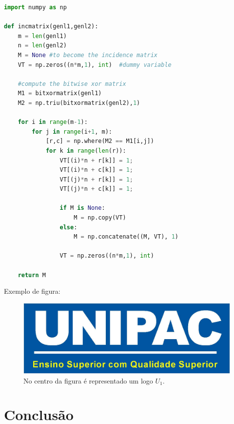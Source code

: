 \begin{lstlisting}[language=Python]
import numpy as np
 
def incmatrix(genl1,genl2):
    m = len(genl1)
    n = len(genl2)
    M = None #to become the incidence matrix
    VT = np.zeros((n*m,1), int)  #dummy variable
 
    #compute the bitwise xor matrix
    M1 = bitxormatrix(genl1)
    M2 = np.triu(bitxormatrix(genl2),1) 
 
    for i in range(m-1):
        for j in range(i+1, m):
            [r,c] = np.where(M2 == M1[i,j])
            for k in range(len(r)):
                VT[(i)*n + r[k]] = 1;
                VT[(i)*n + c[k]] = 1;
                VT[(j)*n + r[k]] = 1;
                VT[(j)*n + c[k]] = 1;
 
                if M is None:
                    M = np.copy(VT)
                else:
                    M = np.concatenate((M, VT), 1)
 
                VT = np.zeros((n*m,1), int)
 
    return M
\end{lstlisting}

Exemplo de figura:

\begin{figure}[htp]
	\centering
	\caption{\label{fig:met-disc-fig01} No centro da figura é representado um logo $U_1$.} 
	\includegraphics[width = 0.8\linewidth]{images/UNIPAC.jpg}
\end{figure}


\chapter{Conclusão}

\lipsum[11-12]






